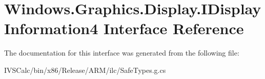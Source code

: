 \hypertarget{interface_windows_1_1_graphics_1_1_display_1_1_i_display_information4}{}\section{Windows.\+Graphics.\+Display.\+I\+Display\+Information4 Interface Reference}
\label{interface_windows_1_1_graphics_1_1_display_1_1_i_display_information4}


The documentation for this interface was generated from the following file\+:\begin{DoxyCompactItemize}
\item 
I\+V\+S\+Calc/bin/x86/\+Release/\+A\+R\+M/ilc/Safe\+Types.\+g.\+cs\end{DoxyCompactItemize}
